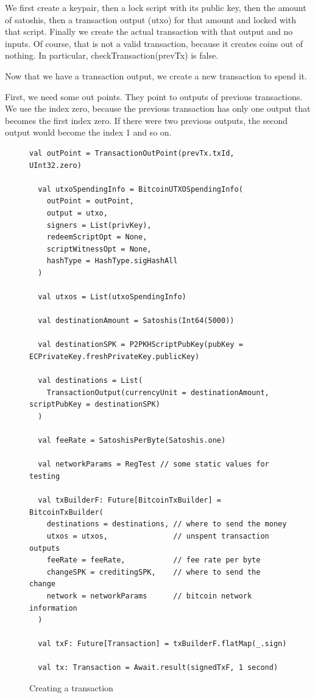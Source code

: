 \documentclass[runningheads]{llncs}
\begin{document}
We first create a keypair, then a lock script with its public key,
then the amount of satoshis, then a transaction output (utxo) for that
amount and locked with that script. Finally we create the actual
transaction with that output and no inputs. Of course, that is not a
valid transaction, because it creates coins out of nothing. In
particular, checkTransaction(prevTx) is false.

Now that we have a transaction output, we create a new transaction to
spend it.

First, we need some out points.  They point to outputs of previous
transactions.  We use the index zero, because the previous transaction
has only one output that becomes the first index zero.  If there were
two previous outputs, the second output would become the index 1 and
so on.
\begin{figure}
\begin{lstlisting}[style=scala]
  val outPoint = TransactionOutPoint(prevTx.txId, UInt32.zero)

  val utxoSpendingInfo = BitcoinUTXOSpendingInfo(
    outPoint = outPoint,
    output = utxo,
    signers = List(privKey),
    redeemScriptOpt = None,
    scriptWitnessOpt = None,
    hashType = HashType.sigHashAll
  )

  val utxos = List(utxoSpendingInfo)

  val destinationAmount = Satoshis(Int64(5000))

  val destinationSPK = P2PKHScriptPubKey(pubKey = ECPrivateKey.freshPrivateKey.publicKey)

  val destinations = List(
    TransactionOutput(currencyUnit = destinationAmount, scriptPubKey = destinationSPK)
  )

  val feeRate = SatoshisPerByte(Satoshis.one)

  val networkParams = RegTest // some static values for testing

  val txBuilderF: Future[BitcoinTxBuilder] = BitcoinTxBuilder(
    destinations = destinations, // where to send the money
    utxos = utxos,               // unspent transaction outputs
    feeRate = feeRate,           // fee rate per byte
    changeSPK = creditingSPK,    // where to send the change
    network = networkParams      // bitcoin network information
  )

  val txF: Future[Transaction] = txBuilderF.flatMap(_.sign)

  val tx: Transaction = Await.result(signedTxF, 1 second)
\end{lstlisting}
  \caption{Creating a transaction}
  \label{fig:tx}
\end{figure}
\end{document}
